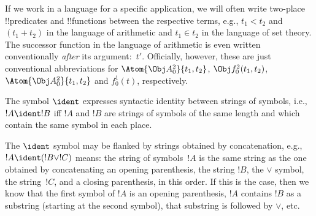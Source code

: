 \documentclass[../../../include/open-logic-section]{subfiles}
\begin{document}
If we work in a language for a specific application, we will often
write two-place !!{predicate}s and !!{function}s between the
respective terms, e.g., $t_1 < t_2$ and $(t_1 + t_2)$ in the language
of arithmetic and $t_1 \in t_2$ in the language of set theory.  The
successor function in the language of arithmetic is even written
conventionally \emph{after} its argument:~$t'$.  Officially, however,
these are just conventional abbreviations for $\Atom{\Obj A^2_0}{t_1, t_2}$,
$\Obj f^2_0(t_1, t_2)$, $\Atom{\Obj A^2_0}{t_1, t_2}$ and $f^1_0(t)$,
respectively.

\begin{defn}
The symbol $\ident$ expresses syntactic identity between strings of
symbols, i.e., $!A \ident !B$ iff $!A$ and $!B$ are strings of symbols
of the same length and which contain the same symbol in each place.
\end{defn}

The $\ident$ symbol may be flanked by strings obtained by
concatenation, e.g., $!A \ident (!B \lor !C)$ means: the string of
symbols~$!A$ is the same string as the one obtained by concatenating
an opening parenthesis, the string $!B$, the $\lor$ symbol, the
string~$!C$, and a closing parenthesis, in this order. If this is the
case, then we know that the first symbol of $!A$ is an opening
parenthesis, $!A$ contains $!B$ as a substring (starting at the second
symbol), that substring is followed by $\lor$, etc.
\end{document}
